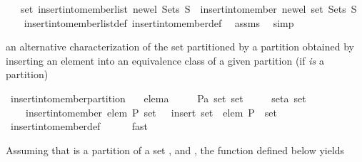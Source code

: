 \begin{isabellebody}
\ \ \ {\isachardoublequoteopen}set\ {\isacharparenleft}insert{\isacharunderscore}into{\isacharunderscore}member{\isacharunderscore}list\ new{\isacharunderscore}el\ Sets\ S{\isacharparenright}\ {\isacharequal}\ insert{\isacharunderscore}into{\isacharunderscore}member\ new{\isacharunderscore}el\ {\isacharparenleft}set\ Sets{\isacharparenright}\ S{\isachardoublequoteclose}\isanewline
%
\isadelimproof
\ \ %
\endisadelimproof
%
\isatagproof
{}\isamarkupfalse%
\ insert{\isacharunderscore}into{\isacharunderscore}member{\isacharunderscore}list{\isacharunderscore}def\ insert{\isacharunderscore}into{\isacharunderscore}member{\isacharunderscore}def\ \isamarkupfalse%
\ assms\ \isamarkupfalse%
\ simp%
\endisatagproof
{\isafoldproof}%
%
\isadelimproof
%
\endisadelimproof
%
\begin{isamarkuptext}%
an alternative characterization of the set partitioned by a partition obtained by 
  inserting an element into an equivalence class of a given partition (if 
  \emph{is} a partition)%
\end{isamarkuptext}%
\isamarkuptrue%
\isamarkupfalse%
\ insert{\isacharunderscore}into{\isacharunderscore}member{\isacharunderscore}partition{}{\isacharcolon}\isanewline
\ \ \ elem{\isacharcolon}{\isacharcolon}{\isacharprime}a\isanewline
\ \ \ \ \ P{\isacharcolon}{\isacharcolon}{\isachardoublequoteopen}{\isacharprime}a\ set\ set{\isachardoublequoteclose}\isanewline
\ \ \ \ \ set{\isacharcolon}{\isacharcolon}{\isachardoublequoteopen}{\isacharprime}a\ set{\isachardoublequoteclose}\isanewline
\ \ \ {\isachardoublequoteopen}{\isasymUnion}\ insert{\isacharunderscore}into{\isacharunderscore}member\ elem\ P\ set\ {\isacharequal}\ {\isasymUnion}\ insert\ {\isacharparenleft}set\ {\isasymunion}\ {\isacharbraceleft}elem{\isacharbraceright}{\isacharparenright}\ {\isacharparenleft}P\ {\isacharminus}\ {\isacharbraceleft}set{\isacharbraceright}{\isacharparenright}{\isachardoublequoteclose}\isanewline
%
\isadelimproof
\isanewline
\ \ \ \ %
\endisadelimproof
%
\isatagproof
{}\isamarkupfalse%
\ insert{\isacharunderscore}into{\isacharunderscore}member{\isacharunderscore}def\isanewline
\ \ \ \ \isamarkupfalse%
\ fast%
\endisatagproof
{\isafoldproof}%
%
\isadelimproof
%
\endisadelimproof
%
\begin{isamarkuptext}%
Assuming that  is a partition of a set , and , the function defined below yields

\end{isamarkuptext}
\end{isabellebody}
